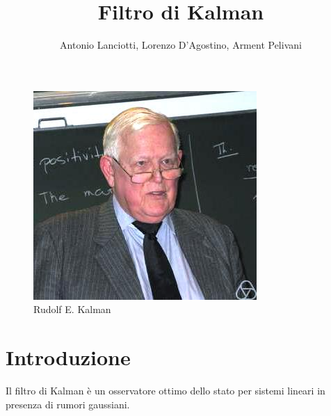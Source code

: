 \documentclass{article}
\title{Filtro di Kalman}
\author{Antonio Lanciotti, Lorenzo D'Agostino, Arment Pelivani}
\begin{document}
\maketitle

\begin{figure}[ht]
\centering
\includegraphics[scale=1]{Rudolf_Kalman.jpg} 
\caption{Rudolf E. Kalman}
\label{fig:kalman}
\end{figure}

\newpage

\tableofcontents

\newpage



\section{Introduzione}
Il filtro di Kalman è un osservatore ottimo dello stato per sistemi lineari in presenza di rumori gaussiani.

\newpage



\newpage



\newpage



\newpage



\newpage
\end{document}
